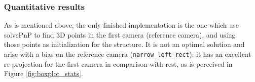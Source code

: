 \subsubsection{Quantitative results}

As is mentioned above, the only finished implementation is the one which use solvePnP to find 3D points in the first camera (reference camera), and using those points as initialization for the structure. It is not an optimal solution and arise with a bias on the reference camera (\texttt{narrow\_left\_rect}): it has an excellent re-projection for the first camera in comparison with rest, as is perceived in Figure \ref{fig:boxplot_stats}.

